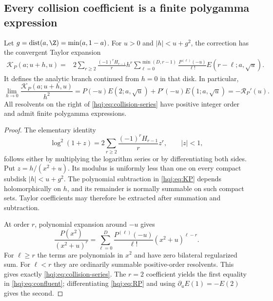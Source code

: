 \subsection{Every collision coefficient is a finite polygamma expression}
\begin{theorem}\label{hqj:thm:collision}
Let $g=\operatorname{dist}(a,\Z)=\min(a,1-a)$. For $u>0$ and
$|h|<u+g^2$, the correction has the convergent Taylor expansion
\begin{align}
\mathcal K_P(a;u+h,u)
={}&2\sum_{r\ge2}\frac{(-1)^rH_{r-1}}r h^r
\sum_{\ell=0}^{\min(D,r-1)}
\frac{P^{(\ell)}(-u)}{\ell!}
E(r-\ell;a,\sqrt u).
\label{hqj:eq:collision-series}
\end{align}
It defines the analytic branch continued from $h=0$ in that disk.
In particular,
\begin{equation}\label{hqj:eq:confluent}
\lim_{h\to0}\frac{\mathcal K_P(a;u+h,u)}{h^2}
=P(-u)E(2;a,\sqrt u)+P'(-u)E(1;a,\sqrt u)
=-\mathcal R_P'(u).
\end{equation}
All resolvents on the right of \eqref{hqj:eq:collision-series} have
positive integer order and admit finite polygamma expressions.
\end{theorem}
\begin{proof}
The elementary identity
\[
\log^2(1+z)=2\sum_{r\ge2}\frac{(-1)^rH_{r-1}}r z^r,
\qquad |z|<1,
\]
follows either by multiplying the logarithm series or by differentiating
both sides. Put $z=h/(x^2+u)$. Its modulus is uniformly less than one
on every compact subdisk $|h|<u+g^2$. The polynomial subtraction in
\eqref{hqj:eq:KP} depends holomorphically on $h$, and its remainder is
normally summable on such compact sets. Taylor coefficients may
therefore be extracted after summation and subtraction.

At order $r$, polynomial expansion around $-u$ gives
\[
\frac{P(x^2)}{(x^2+u)^r}
=\sum_{\ell=0}^D\frac{P^{(\ell)}(-u)}{\ell!}(x^2+u)^{\ell-r}.
\]
For $\ell\ge r$ the terms are polynomials in $x^2$ and have zero
bilateral regularized sum. For $\ell<r$ they are ordinarily summable
positive-order resolvents. This gives exactly
\eqref{hqj:eq:collision-series}. The $r=2$ coefficient yields the
first equality in \eqref{hqj:eq:confluent}; differentiating
\eqref{hqj:eq:RP} and using $\partial_uE(1)=-E(2)$ gives the second.
\end{proof}

